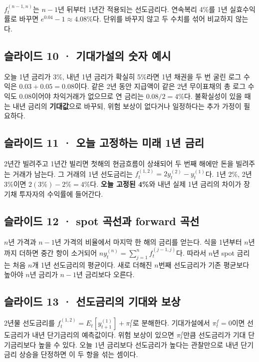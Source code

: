 \documentclass[11pt,a4paper]{article}
\begin{document}
$f_t^{(n-1,n)}$는 $n-1$년 뒤부터 1년간 적용되는 선도금리다. 연속복리 4\%를 1년 실효수익률로 바꾸면 $e^{0.04}-1\approx4.08\%$다. 단위를 바꾸지 않고 두 수치를 섞어 비교하지 않는다.\par

\subsection{슬라이드 10 · 기대가설의 숫자 예시}
오늘 1년 금리가 3\%, 내년 1년 금리가 확실히 5\%라면 1년 채권을 두 번 굴린 로그 수익은 $0.03+0.05=0.08$이다. 같은 2년 동안 지급액이 같은 2년 무이표채의 총 로그 수익도 0.08이어야 차익거래가 없으므로 연 금리는 $0.08/2=4\%$다. 불확실성이 있을 때는 내년 금리의 \textbf{기대값}으로 바꾸되, 위험 보상이 없다거나 일정하다는 추가 가정이 필요하다.\par

\subsection{슬라이드 11 · 오늘 고정하는 미래 1년 금리}
2년간 빌려주고 1년간 빌리면 첫해의 현금흐름이 상쇄되어 두 번째 해에만 돈을 빌려주는 거래가 남는다. 그 거래의 1년 선도금리는 $f_t^{(1,2)}=2y_t^{(2)}-y_t^{(1)}$다. 1년 2\%, 2년 3\%이면 $2(3\%)-2\%=4\%$다. \textbf{오늘 고정된 4\%}와 내년 실제 1년 금리의 차이가 장기채 투자자의 수익률에 들어간다.\par

\subsection{슬라이드 12 · spot 곡선과 forward 곡선}
$n$년 가격과 $n-1$년 가격의 비율에서 마지막 한 해의 금리를 얻는다. 식을 1년부터 $n$년까지 더하면 중간 항이 소거되어 $ny_t^{(n)}=\sum_{j=1}^{n}f_t^{(j-1,j)}$다. 따라서 $n$년 spot 금리는 처음 $n$개 1년 선도금리의 평균이다. 새로 더해진 $n$번째 선도금리가 기존 평균보다 높아야 $n$년 금리가 $n-1$년 금리보다 오른다.\par

\subsection{슬라이드 13 · 선도금리의 기대와 보상}
2년물 선도금리를 $f_t^{(1,2)}=E_t[y_{t+1}^{(1)}]+\pi_t^f$로 분해한다. 기대가설에서 $\pi_t^f=0$이면 선도금리가 내년 단기금리의 예측값이다. 위험 보상이 있으면 $\pi_t^f$만큼 선도금리가 기대 단기금리보다 높을 수 있다. 오늘 1년 금리보다 선도금리가 높다는 관찰만으로 내년 단기금리 상승을 단정하면 이 두 항을 섞는 셈이다.\par
\end{document}

